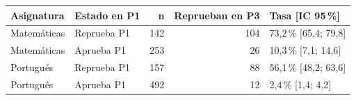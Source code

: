 \begin{tabular}{llrrl}
\toprule
Asignatura & Estado en P1 & n & Reprueban en P3 & Tasa [IC 95\,\%] \\
\midrule
Matemáticas & Reprueba P1 & 142 & 104 & 73,2\,\% [65,4; 79,8] \\
Matemáticas & Aprueba P1 & 253 & 26 & 10,3\,\% [7,1; 14,6] \\
Portugués & Reprueba P1 & 157 & 88 & 56,1\,\% [48,2; 63,6] \\
Portugués & Aprueba P1 & 492 & 12 & 2,4\,\% [1,4; 4,2] \\
\bottomrule
\end{tabular}
